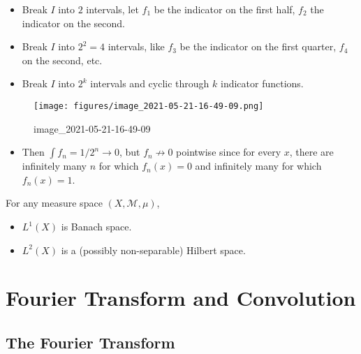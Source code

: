 \begin{proposition}
\begin{itemize}
  \begin{itemize}
  \tightlist
  \item
    Break \(I\) into \(2\) intervals, let \(f_1\) be the indicator on
    the first half, \(f_2\) the indicator on the second.
  \item
    Break \(I\) into \(2^2=4\) intervals, like \(f_3\) be the indicator
    on the first quarter, \(f_4\) on the second, etc.
  \item
    Break \(I\) into \(2^k\) intervals and cyclic through \(k\)
    indicator functions.
  \end{itemize}

  \begin{figure}
  \centering
  \texttt{[image: figures/image\_2021-05-21-16-49-09.png]}
  \caption{image\_2021-05-21-16-49-09}
  \end{figure}

  \begin{itemize}
  \tightlist
  \item
    Then \(\int f_n = 1/2^n \to 0\), but \(f_n\not\to 0\) pointwise
    since for every \(x\), there are infinitely many \(n\) for which
    \(f_n(x) = 0\) and infinitely many for which \(f_n(x) = 1\).
  \end{itemize}
\end{itemize}

\end{proposition}

\begin{proposition}

For any measure space \((X, {\mathcal{M}}, \mu)\),

\begin{itemize}
\tightlist
\item
  \(L^1(X)\) is Banach space.
\item
  \(L^2(X)\) is a (possibly non-separable) Hilbert space.
\end{itemize}

\end{proposition}

\hypertarget{fourier-transform-and-convolution}{%
\section{Fourier Transform and
Convolution}\label{fourier-transform-and-convolution}}

\hypertarget{the-fourier-transform}{%
\subsection{The Fourier Transform}\label{the-fourier-transform}}

